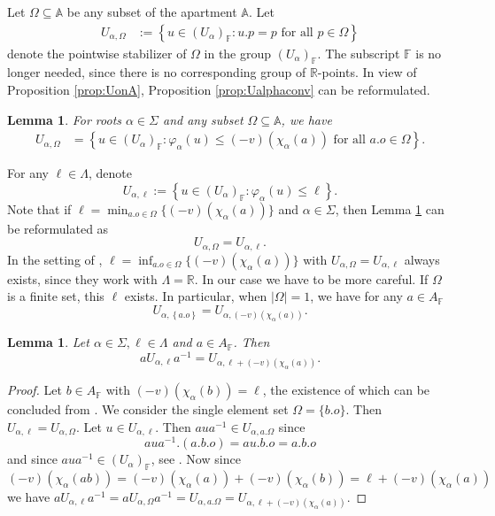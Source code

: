 \documentclass[12pt]{amsart}
\newcommand{\F}{\mathbb{F} }
\newcommand{\R}{\mathbb{R} }
\newcommand{\frakg}{\mathfrak{g}}
\newcommand{\A}{\mathbb{A}}
\numberwithin{equation}{section}
\newtheorem{lemma}[theorem]{Lemma}
\theoremstyle{remark} %
\begin{document}
Let $\Omega \subseteq \A$ be any subset of the apartment $\A$. Let
\begin{align*}
	U_{\alpha, \Omega} &:= \left\{ u \in (U_\alpha)_{\F} \colon  u.p = p \text{ for all } p \in \Omega  \right\}%
\end{align*}
denote the pointwise stabilizer of $\Omega$ in the group $(U_{\alpha})_\F$. The subscript $\F$ is no longer needed, since there is no corresponding group of $\R$-points. In view of Proposition \ref{prop:UonA}, Proposition \ref{prop:Ualphaconv} can be reformulated.
\begin{lemma}\label{lem:BTUalphaOmega}
	For roots $\alpha \in \Sigma$ and any subset $\Omega \subseteq \A$, we have
	\begin{align*}
		U_{\alpha,\Omega} 
		&= \left\{  u \in (U_\alpha)_\F \colon  \varphi_\alpha(u) \leq (-v)\left(\chi_\alpha\left(a\right)\right) \text{ for all } a.o \in \Omega  \right\} .
	\end{align*}
\end{lemma}
For any $\ell \in \Lambda$, denote 
$$
U_{\alpha, \ell} := \left\{ u \in (U_\alpha)_\F \colon \varphi_\alpha(u) \leq \ell \right\}.
$$
Note that if $\ell = \min_{a.o \in \Omega} \{ (-v)(\chi_\alpha(a)) \}$ and $\alpha \in \Sigma$, then Lemma \ref{lem:BTUalphaOmega} can be reformulated as
$$
U_{\alpha,\Omega} = U_{\alpha, \ell}.
$$
In the setting of \cite{BrTi}, $\ell = \inf_{a.o \in \Omega} \{ (-v)(\chi_\alpha(a)) \}$ with $U_{\alpha,\Omega} = U_{\alpha,\ell}$ always exists, since they work with $\Lambda=\R$. In our case we have to be more careful. If $\Omega$ is a finite set, this $\ell$ exists. In particular, when $|\Omega| = 1$, we have for any $a\in A_\F$
$$
U_{\alpha,\left\{ a.o \right\}} = U_{\alpha, (-v)(\chi_\alpha(a))}.
$$
\begin{lemma}\label{lem:BTaUa}
	Let $\alpha \in \Sigma, \ell \in \Lambda$ and $a \in A_\F$. Then
	$$
	a U_{\alpha , \ell} a^{-1} = U_{\alpha,\ell + (-v)(\chi_\alpha(a))}.
	$$
\end{lemma}
\begin{proof}
	Let $b \in A_\F$ with $(-v)(\chi_\alpha(b)) = \ell $, the existence of which can be concluded from \cite[Lemma \ref{I-lem:Jacobson_Morozov_oneparam}]{AppAGRCF}. We consider the single element set $\Omega = \{b.o\} $. Then $U_{\alpha, \ell} = U_{\alpha, \Omega}$. Let $u \in U_{\alpha, \ell}$. Then $aua^{-1} \in U_{\alpha, a.\Omega}$ since
	$$
	aua^{-1}.(a.b.o) = au.b.o = a.b.o  
	$$
	and since $aua^{-1} \in (U_\alpha)_\F$, see \cite[Proposition \ref{I-prop:anainN}]{AppAGRCF}. Now since 
	$$
	(-v)(\chi_{\alpha}(ab)) = (-v)(\chi_\alpha(a)) + (-v)(\chi_\alpha(b)) = \ell + (-v)(\chi_\alpha(a)) 
	$$
	we have $aU_{\alpha, \ell}a^{-1} = aU_{\alpha, \Omega}a^{-1} = U_{\alpha, a.\Omega} = U_{\alpha, \ell + (-v)(\chi_\alpha(a))}$.
\end{proof}
\end{document}
